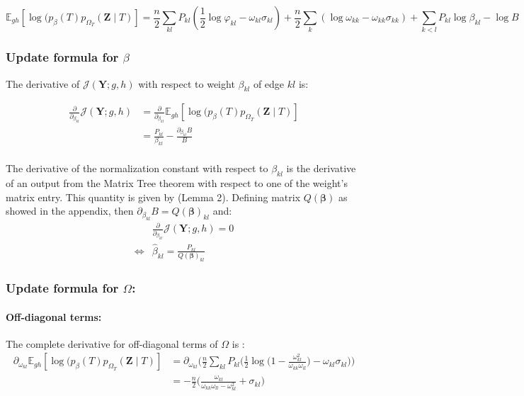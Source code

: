 \documentclass[11pt,a4paper]{article}
\newcommand{\betabf}{\boldsymbol{\beta}}
\newcommand{\Ybf}{\boldsymbol{Y}}
\newcommand{\Zbf}{\boldsymbol{Z}}
\newcommand{\Esp}{\mathds{E}}
\begin{document}
 $$\boxed{\Esp_{gh} [\log (p_\beta(T)p_{\Omega_T}(\Zbf\mid T) ]  =  \frac{n}{2} \sum_{kl} P_{kl} ( \frac{1}{2} \log \varphi_{kl} -\omega_{kl} \sigma_{kl} ) + \frac{n}{2} \sum_k (\log \omega_{kk} - \omega_{kk} \sigma_{kk}) +\sum_{k<l} P_{kl} \log  \beta_{kl} - \log B }$$
\subsubsection{Update formula for $\beta$}
 The derivative of $ \mathcal{J}(\Ybf ; g,h)$ with respect to weight $\beta_{kl}$ of edge $kl$ is:
 
 \begin{align*}
\frac{\partial}{\partial_{\beta_{kl}}} \mathcal{J}(\Ybf ; g,h) &=  \frac{\partial}{\partial_{\beta_{kl}}} \Esp_{gh} [\log (p_\beta(T)p_{\Omega_T}(\Zbf\mid T) ] \\
&= \frac{P_{kl}}{\beta_{kl}} - \frac{\partial_{\beta_{kl}} B }{B} \\
\end{align*}

The derivative of the normalization constant with respect to $\beta_{kl}$ is the derivative of an output from the Matrix Tree theorem with respect to one of the weight's matrix entry. This quantity is given by \citet{Meila} (Lemma 2). Defining matrix $Q(\betabf)$ as showed in the appendix, then $\partial_{\beta_{kl}} B = Q(\betabf)_{kl}$ and:
 \begin{align*}
&\frac{\partial}{\partial_{\beta_{kl}}} \mathcal{J}(\Ybf ; g,h) 
=0 \\
\iff & \boxed{\widehat{\beta}_{kl} = \frac{P_{kl}}{ Q(\betabf)_{kl}} }
\end{align*}

\subsubsection{Update formula for $\Omega$:}
  
\paragraph{Off-diagonal terms:\\}

 The complete derivative for off-diagonal terms of $\Omega$ is :
\begin{align*}
 \partial_{\omega_{kl}}\Esp_{gh} [\log (p_\beta(T)p_{\Omega_T}(\Zbf\mid T) ] &= \partial_{\omega_{kl}}\Big(\frac{n}{2} \sum_{kl} P_{kl} \Big( \frac{1}{2} \log \big(1 - \frac{\omega_{kl}^2}{\omega_{kk} \omega_{ll}}\big) -\omega_{kl} \sigma_{kl} \Big) \Big)\\
 &= -\frac{n}{2} \Big( \frac{\omega_{kl}}{\omega_{kk} \omega_{ll} - \omega_{kl}^2} + \sigma_{kl}\Big)
 \end{align*}
 
\end{document}
